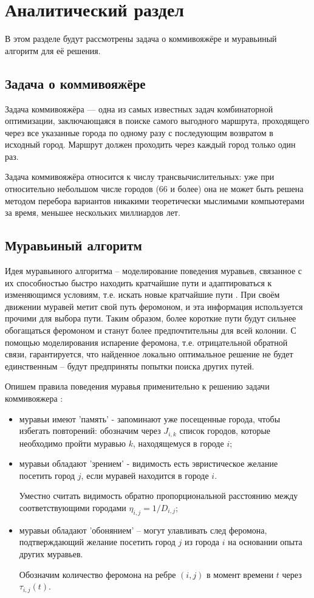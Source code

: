 \chapter{Аналитический раздел}
В этом разделе будут рассмотрены задача о коммивояжёре и муравьиный алгоритм для её решения.

\section{Задача о коммивояжёре}
Задача коммивояжёра — одна из самых известных задач комбинаторной оптимизации, заключающаяся в поиске самого выгодного маршрута, 
проходящего через все указанные города по одному разу с последующим возвратом в исходный город.
Маршрут должен проходить через каждый город только один раз.\cite{commi}

Задача коммивояжёра относится к числу трансвычислительных: уже при относительно небольшом числе городов (66 и более) она не может быть решена методом перебора вариантов никакими теоретически мыслимыми компьютерами за время, меньшее нескольких миллиардов лет.

\section{Муравьиный алгоритм}
Идея муравьиного алгоритма -- моделирование поведения муравьев, связанное с их способностью быстро находить кратчайшие пути и адаптироваться к изменяющимся условиям, т.е. искать новые кратчайшие пути \cite{ant1}. 
При своём движении муравей метит свой путь феромоном, и эта информация используется прочими для выбора пути. 
Таким образом, более короткие пути будут сильнее обогащаться феромоном и станут более предпочтительны для всей колонии. 
С помощью моделирования испарение феромона, т.е. отрицательной обратной связи, гарантируется, что найденное локально оптимальное решение не будет единственным -- будут предприняты попытки поиска других путей.

Опишем правила поведения муравья применительно к решению задачи коммивояжера \cite{shtovba}:
\begin{itemize}
	\item муравьи имеют 'память' - запоминают уже посещенные города, чтобы избегать повторений: обозначим через $J_{i,k}$ список городов, которые необходимо пройти муравью $k$, находящемуся в городе $i$;
	\item муравьи обладают 'зрением' - видимость есть эвристическое желание посетить город $j$, если муравей находится в городе $i$. 
	
	Уместно считать видимость обратно пропорциональной расстоянию между соответствующими городами $\eta_{i,j} = 1/D_{i,j}$;
	\item муравьи обладают 'обонянием' -- могут улавливать след феромона, подтверждающий желание посетить город $j$ из города $i$ на основании опыта других муравьев. 

	Обозначим количество феромона на ребре $(i,j)$ в момент времени $t$ через $\tau_{i,j}(t)$. 
\end{itemize}

